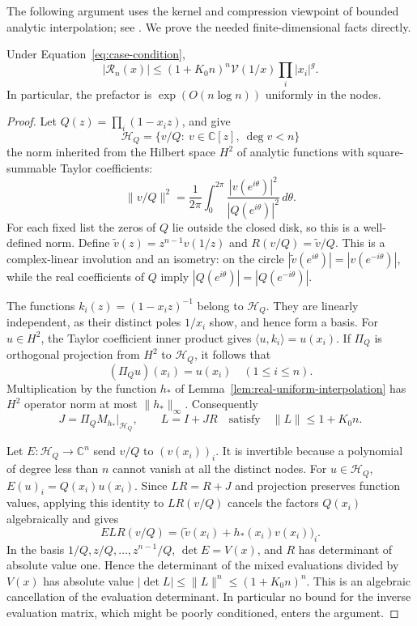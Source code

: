 The following argument uses the kernel and compression viewpoint of
bounded analytic interpolation; see \cite{Sarason1967}.
We prove the needed finite-dimensional facts directly.

\begin{proposition}\label{prop:first-sheet-bound}
Under Equation~\eqref{eq:case-condition},
\begin{equation}\label{eq:real-first-sheet-bound}
 |\mathcal R_n(x)|\le(1+K_0n)^n
       \mathcal V(1/x)\prod_i|x_i|^g.
\end{equation}
In particular, the prefactor is $\exp(O(n\log n))$ uniformly in the nodes.
\end{proposition}

\begin{proof}
Let $Q(z)=\prod_i(1-x_i z)$, and give
\[
 \mathcal H_Q=\{v/Q:\ v\in\mathbb C[z],\ \deg v<n\}
\]
the norm inherited from the Hilbert space $H^2$ of analytic functions
with square-summable Taylor coefficients:
\[
 \|v/Q\|^2=\frac1{2\pi}\int_0^{2\pi}
          \frac{|v(e^{i\theta})|^2}{|Q(e^{i\theta})|^2}\,d\theta.
\]
For each fixed list the zeros of $Q$ lie outside the closed disk, so
this is a well-defined norm.  Define
$\widetilde v(z)=z^{n-1}v(1/z)$ and
$R(v/Q)=\widetilde v/Q$.  This is a complex-linear involution and
an isometry: on the circle
$|\widetilde v(e^{i\theta})|=|v(e^{-i\theta})|$, while the real
coefficients of $Q$ imply
$|Q(e^{i\theta})|=|Q(e^{-i\theta})|$.

The functions $k_i(z)=(1-x_i z)^{-1}$ belong to $\mathcal H_Q$.
They are linearly independent, as their distinct poles $1/x_i$ show,
and hence form a basis.  For $u\in H^2$, the Taylor coefficient
inner product gives $\langle u,k_i\rangle=u(x_i)$.
If $\Pi_Q$ is orthogonal projection from $H^2$ to $\mathcal H_Q$,
it follows that
\[
 (\Pi_Q u)(x_i)=u(x_i)\quad(1\le i\le n).
\]
Multiplication by the function $h_*$ of
Lemma~\ref{lem:real-uniform-interpolation} has $H^2$ operator norm
at most $\|h_*\|_\infty$.  Consequently
\[
 J=\Pi_Q M_{h_*}|_{\mathcal H_Q},\qquad L=I+JR
 \quad\text{satisfy}\quad \|L\|\le1+K_0n.
\]

Let $E:\mathcal H_Q\to\mathbb C^n$ send $v/Q$ to
$(v(x_i))_i$.  It is invertible because a polynomial of degree less
than $n$ cannot vanish at all the distinct nodes.
For $u\in\mathcal H_Q$, $E(u)_i=Q(x_i)u(x_i)$.
Since $LR=R+J$ and projection preserves function values, applying
this identity to $LR(v/Q)$ cancels the factors $Q(x_i)$
algebraically and gives
\begin{equation}\label{eq:real-evaluation-cancellation}
 E L R(v/Q)=\bigl(\widetilde v(x_i)+h_*(x_i)v(x_i)\bigr)_i.
\end{equation}
In the basis $1/Q,z/Q,\ldots,z^{n-1}/Q$, $\det E=V(x)$,
and $R$ has determinant of absolute value one.  Hence the determinant
of the mixed evaluations divided by $V(x)$ has absolute value
$|\det L|\le\|L\|^n\le(1+K_0n)^n$.  This is an algebraic
cancellation of the evaluation determinant.  In particular no bound
for the inverse evaluation matrix, which might be poorly conditioned,
enters the argument.


\end{proof}
